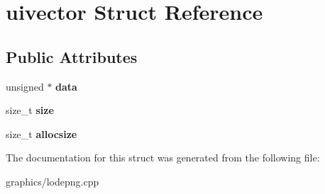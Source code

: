 \hypertarget{structuivector}{\section{uivector Struct Reference}
\label{structuivector}
}
\subsection*{Public Attributes}
\begin{DoxyCompactItemize}
\item 
\hypertarget{structuivector_a427d761df4bb4f0f19b4a973fc224c78}{unsigned $\ast$ {\bfseries data}}\label{structuivector_a427d761df4bb4f0f19b4a973fc224c78}

\item 
\hypertarget{structuivector_aa999025945f0c93d0461192475ae2720}{size\+\_\+t {\bfseries size}}\label{structuivector_aa999025945f0c93d0461192475ae2720}

\item 
\hypertarget{structuivector_aac0395a9ad397ae7a28219561ab49ffa}{size\+\_\+t {\bfseries allocsize}}\label{structuivector_aac0395a9ad397ae7a28219561ab49ffa}

\end{DoxyCompactItemize}


The documentation for this struct was generated from the following file\+:\begin{DoxyCompactItemize}
\item 
graphics/lodepng.\+cpp\end{DoxyCompactItemize}

